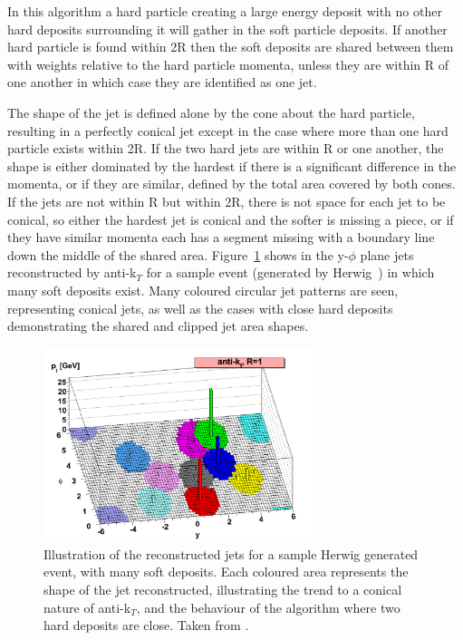 In this algorithm a hard particle creating a large energy deposit with no other hard deposits surrounding it will gather in the soft particle deposits. If another hard particle is found within 2R then the soft deposits are shared between them with weights relative to the hard particle momenta, unless they are within R of one another in which case they are identified as one jet. 

The shape of the jet is defined alone by the cone about the hard particle, resulting in a perfectly conical jet except in the case where more than one hard particle exists within 2R. If the two hard jets are within R or one another, the shape is either dominated by the hardest if there is a significant difference in the momenta, or if they are similar, defined by the total area covered by both cones. If the jets are not within R but within 2R, there is not space for each jet to be conical, so either the hardest jet is conical and the softer is missing a piece, or if they have similar momenta each has a segment missing with a boundary line down the middle of the shared area. Figure~\ref{fig:akt} shows in the y-$\phi$ plane jets reconstructed by anti-k$_{T}$ for a sample event (generated by Herwig~\cite{HERWIG}) in which many soft deposits exist. Many coloured circular jet patterns are seen, representing conical jets, as well as the cases with close hard deposits demonstrating the shared and clipped jet area shapes. 

\begin{figure}
\centering
\includegraphics[width=0.7\textwidth]{Figures/Objects/akt}
\caption{\label{fig:akt}Illustration of the reconstructed jets for a sample Herwig generated event, with many soft deposits. Each coloured area represents the shape of the jet reconstructed, illustrating the trend to a conical nature of anti-k$_{T}$, and the behaviour of the algorithm where two hard deposits are close. Taken from \cite{akt}.}
\end{figure}

